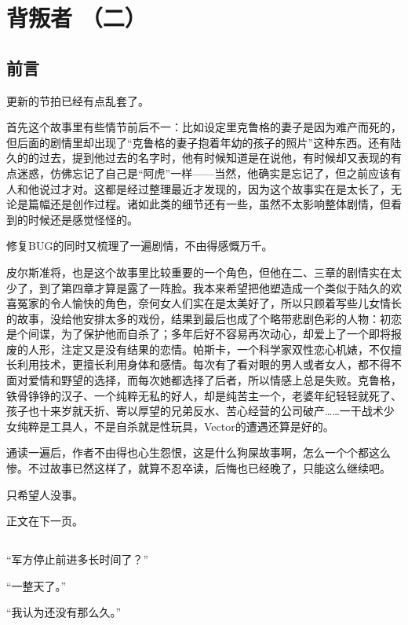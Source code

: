\chapter{背叛者 （二）}

\section*{前言}

更新的节拍已经有点乱套了。

首先这个故事里有些情节前后不一：比如设定里克鲁格的妻子是因为难产而死的，但后面的剧情里却出现了“克鲁格的妻子抱着年幼的孩子的照片”这种东西。还有陆久的的过去，提到他过去的名字时，他有时候知道是在说他，有时候却又表现的有点迷惑，仿佛忘记了自己是“阿虎”一样——当然，他确实是忘记了，但之前应该有人和他说过才对。这都是经过整理最近才发现的，因为这个故事实在是太长了，无论是篇幅还是创作过程。诸如此类的细节还有一些，虽然不太影响整体剧情，但看到的时候还是感觉怪怪的。

修复BUG的同时又梳理了一遍剧情，不由得感慨万千。

皮尔斯准将，也是这个故事里比较重要的一个角色，但他在二、三章的剧情实在太少了，到了第四章才算是露了一阵脸。我本来希望把他塑造成一个类似于陆久的欢喜冤家的令人愉快的角色，奈何女人们实在是太美好了，所以只顾着写些儿女情长的故事，没给他安排太多的戏份，结果到最后也成了个略带悲剧色彩的人物：初恋是个间谍，为了保护他而自杀了；多年后好不容易再次动心，却爱上了一个即将报废的人形，注定又是没有结果的恋情。帕斯卡，一个科学家双性恋心机婊，不仅擅长利用技术，更擅长利用身体和感情。每次有了看对眼的男人或者女人，都不得不面对爱情和野望的选择，而每次她都选择了后者，所以情感上总是失败。克鲁格，铁骨铮铮的汉子、一个纯粹无私的好人，却是纯苦主一个，老婆年纪轻轻就死了、孩子也十来岁就夭折、寄以厚望的兄弟反水、苦心经营的公司破产……一干战术少女纯粹是工具人，不是自杀就是性玩具，Vector的遭遇还算是好的。

通读一遍后，作者不由得也心生怨恨，这是什么狗屎故事啊，怎么一个个都这么惨。不过故事已然这样了，就算不忍卒读，后悔也已经晚了，只能这么继续吧。

只希望人没事。

正文在下一页。

\section*{}

“军方停止前进多长时间了？”

“一整天了。”

“我认为还没有那么久。”

